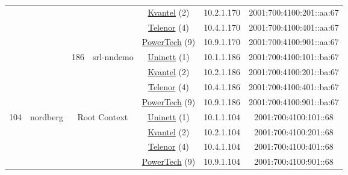 \begin{small}
\begin{center}
\begin{longtable}{|c|c|c|c|c|c|c|c|}
  &  &  &  & \multicolumn{2}{|c|}{\tiny{\href{http://kvantel.no}{Kvantel} (2)}} & \tiny{10.2.1.170} & \tiny{2001:700:4100:201::aa:67} \\* \cline{5-5}\cline{6-6}\cline{7-7}\cline{8-8}
  &  &  &  & \multicolumn{2}{|c|}{\tiny{\href{https://www.telenor.no}{Telenor} (4)}} & \tiny{10.4.1.170} & \tiny{2001:700:4100:401::aa:67} \\* \cline{5-5}\cline{6-6}\cline{7-7}\cline{8-8}
  &  &  &  & \multicolumn{2}{|c|}{\tiny{\href{http://www.powertech.no}{PowerTech} (9)}} & \tiny{10.9.1.170} & \tiny{2001:700:4100:901::aa:67} \\* \cline{3-3}\cline{4-4}\cline{5-5}\cline{6-6}\cline{7-7}\cline{8-8}
  &  & \multirow{4}{*}{\tiny{186}} & \multicolumn{1}{|l|}{\multirow{4}{*}{\tiny{srl-nndemo}}} & \multicolumn{2}{|c|}{\tiny{\href{https://www.uninett.no}{Uninett} (1)}} & \tiny{10.1.1.186} & \tiny{2001:700:4100:101::ba:67} \\* \cline{5-5}\cline{6-6}\cline{7-7}\cline{8-8}
  &  &  &  & \multicolumn{2}{|c|}{\tiny{\href{http://kvantel.no}{Kvantel} (2)}} & \tiny{10.2.1.186} & \tiny{2001:700:4100:201::ba:67} \\* \cline{5-5}\cline{6-6}\cline{7-7}\cline{8-8}
  &  &  &  & \multicolumn{2}{|c|}{\tiny{\href{https://www.telenor.no}{Telenor} (4)}} & \tiny{10.4.1.186} & \tiny{2001:700:4100:401::ba:67} \\* \cline{5-5}\cline{6-6}\cline{7-7}\cline{8-8}
  &  &  &  & \multicolumn{2}{|c|}{\tiny{\href{http://www.powertech.no}{PowerTech} (9)}} & \tiny{10.9.1.186} & \tiny{2001:700:4100:901::ba:67} \\ \hline
 \multirow{32}{*}{\tiny{104}} & \multicolumn{1}{|l|}{\multirow{32}{*}{\tiny{nordberg}}} & \multicolumn{2}{|c|}{\multirow{4}{*}{\tiny{Root Context}}} & \multicolumn{2}{|c|}{\tiny{\href{https://www.uninett.no}{Uninett} (1)}} & \tiny{10.1.1.104} & \tiny{2001:700:4100:101::68} \\* \cline{5-5}\cline{6-6}\cline{7-7}\cline{8-8}
  &  & \multicolumn{2}{|c|}{} & \multicolumn{2}{|c|}{\tiny{\href{http://kvantel.no}{Kvantel} (2)}} & \tiny{10.2.1.104} & \tiny{2001:700:4100:201::68} \\* \cline{5-5}\cline{6-6}\cline{7-7}\cline{8-8}
  &  & \multicolumn{2}{|c|}{} & \multicolumn{2}{|c|}{\tiny{\href{https://www.telenor.no}{Telenor} (4)}} & \tiny{10.4.1.104} & \tiny{2001:700:4100:401::68} \\* \cline{5-5}\cline{6-6}\cline{7-7}\cline{8-8}
  &  & \multicolumn{2}{|c|}{} & \multicolumn{2}{|c|}{\tiny{\href{http://www.powertech.no}{PowerTech} (9)}} & \tiny{10.9.1.104} & \tiny{2001:700:4100:901::68} \\* \cline{3-3}\cline{4-4}\cline{5-5}\cline{6-6}\cline{7-7}\cline{8-8}

\end{longtable}
\end{center}
\end{small}
